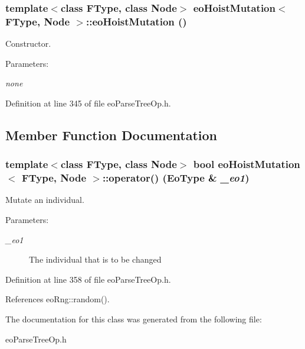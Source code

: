 \subsubsection{\setlength{\rightskip}{0pt plus 5cm}template$<$class FType, class Node$>$ {\bf eo\-Hoist\-Mutation}$<$ FType, Node $>$::{\bf eo\-Hoist\-Mutation} ()\hspace{0.3cm}{\tt  [inline]}}\label{classeo_hoist_mutation_a0}


Constructor. 

\begin{Desc}
\item[Parameters:]
\begin{description}
\item[{\em none}]\end{description}
\end{Desc}


Definition at line 345 of file eo\-Parse\-Tree\-Op.h.

\subsection{Member Function Documentation}
\subsubsection{\setlength{\rightskip}{0pt plus 5cm}template$<$class FType, class Node$>$ bool {\bf eo\-Hoist\-Mutation}$<$ FType, Node $>$::operator() ({\bf Eo\-Type} \& {\em \_\-eo1})\hspace{0.3cm}{\tt  [inline]}}\label{classeo_hoist_mutation_a3}


Mutate an individual. 

\begin{Desc}
\item[Parameters:]
\begin{description}
\item[{\em \_\-eo1}]The individual that is to be changed \end{description}
\end{Desc}


Definition at line 358 of file eo\-Parse\-Tree\-Op.h.

References eo\-Rng::random().

The documentation for this class was generated from the following file:\begin{CompactItemize}
\item 
eo\-Parse\-Tree\-Op.h\end{CompactItemize}
